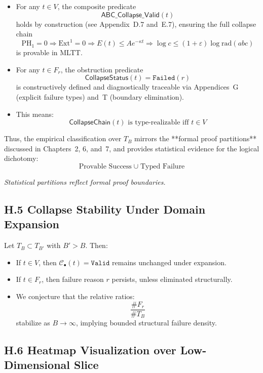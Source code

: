 \documentclass[11pt]{article}
\begin{document}
\begin{itemize}
  \item For any \( t \in V \), the composite predicate
  \[
  \mathsf{ABC\_Collapse\_Valid}(t)
  \]
  holds by construction (see Appendix~D.7 and~E.7), ensuring the full collapse chain
  \[
  \mathrm{PH}_1 = 0 \Rightarrow \mathrm{Ext}^1 = 0 \Rightarrow E(t) \leq A e^{-\kappa t} \Rightarrow \log c \leq (1+\varepsilon)\log \mathrm{rad}(abc)
  \]
  is provable in MLTT.
  
  \item For any \( t \in F_r \), the obstruction predicate
  \[
  \mathsf{CollapseStatus}(t) = \texttt{Failed}(r)
  \]
  is constructively defined and diagnostically traceable via Appendices~G (explicit failure types) and~T (boundary elimination).

  \item This means: 
  \[
  \mathsf{CollapseChain}(t) \text{ is type-realizable iff } t \in V
  \]
\end{itemize}

\noindent
Thus, the empirical classification over \( T_B \) mirrors the **formal proof partitions** discussed in Chapters~2, 6, and~7, and provides statistical evidence for the logical dichotomy:
\[
\boxed{
  \text{Provable Success} \;\cup\; \text{Typed Failure}
}
\]

\begin{center}
\textit{Statistical partitions reflect formal proof boundaries.}
\end{center}



\subsection*{H.5 Collapse Stability Under Domain Expansion}

Let \( T_B \subset T_{B'} \) with \( B' > B \). Then:
\begin{itemize}
  \item If \( t \in V \), then \( \mathcal{C}_\bullet(t) = \texttt{Valid} \) remains unchanged under expansion.
  \item If \( t \in F_r \), then failure reason \( r \) persists, unless eliminated structurally.
  \item We conjecture that the relative ratios:
  \[
  \frac{\# F_r}{\# T_B}
  \]
  stabilize as \( B \to \infty \), implying bounded structural failure density.
\end{itemize}

\subsection*{H.6 Heatmap Visualization over Low-Dimensional Slice}
\end{document}
